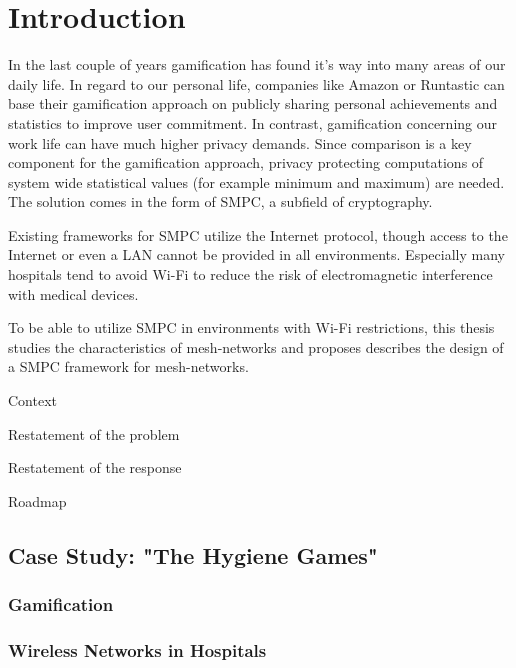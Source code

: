 \printnoidxglossary[type=\acronymtype,title={List of Acronyms}]

{\let\clearpage\relax \printnoidxglossary[type=symbols,sort=letter]}

\chapter{Introduction}
In the last couple of years gamification has found it's way into many areas of our daily life. In regard to our personal life, companies like Amazon or Runtastic can base their gamification approach on publicly sharing personal achievements and statistics to improve user commitment. In contrast, gamification concerning our work life can have much higher privacy demands. Since comparison is a key component for the gamification approach, privacy protecting computations of system wide statistical values (for example minimum and maximum) are needed. The solution comes in the form of \gls{SMPC}, a subfield of cryptography.

Existing frameworks for \gls{SMPC} utilize the Internet protocol, though access to the Internet or even a \gls{LAN} cannot be provided in all environments. Especially many hospitals tend to avoid Wi-Fi to reduce the risk of electromagnetic interference with medical devices.

To be able to utilize \gls{SMPC} in environments with Wi-Fi restrictions, this thesis studies the characteristics of mesh-networks and proposes describes the design of a \gls{SMPC} framework for mesh-networks. 

Context

Restatement of the problem

Restatement of the response

Roadmap

	\section{Case Study: "The Hygiene Games"}

		\subsection*{Gamification}
	
		\subsection*{Wireless Networks in Hospitals}

